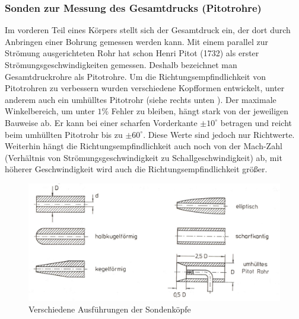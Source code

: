 \subsubsection{Sonden zur Messung des Gesamtdrucks (Pitotrohre)}
Im vorderen Teil eines Körpers stellt sich der Gesamtdruck ein, der dort durch Anbringen einer Bohrung gemessen werden kann. Mit einem parallel zur Strömung ausgerichteten Rohr hat schon Henri Pitot (1732) als erster Strömungsgeschwindigkeiten gemessen. Deshalb bezeichnet man Gesamtdruckrohre als Pitotrohre. Um die Richtungsempfindlichkeit von Pitotrohren zu verbessern wurden verschiedene Kopfformen entwickelt, unter anderem auch ein umhülltes Pitotrohr (siehe rechts unten ). Der maximale Winkelbereich, um unter $ 1 \% $ Fehler zu bleiben, hängt stark von der jeweiligen Bauweise ab. Er kann bei einer scharfen Vorderkante $ \pm 10^{\circ} $ betragen und reicht beim umhüllten Pitotrohr bis zu $ \pm 60^{\circ} $. Diese Werte sind jedoch nur Richtwerte. Weiterhin hängt die Richtungsempfindlichkeit auch noch von der Mach-Zahl (Verhältnis von Strömungsgeschwindigkeit zu Schallgeschwindigkeit) ab, mit höherer Geschwindigkeit wird auch die Richtungsempfindlichkeit größer.
\begin{figure}
	\centering
	\includegraphics[width=\textwidth]{images/sonden.jpg}
	\caption{Verschiedene Ausführungen der Sondenköpfe}
	\label{sonden}
\end{figure}


